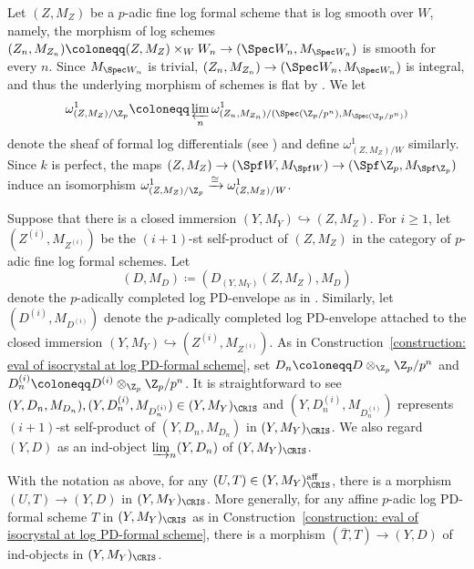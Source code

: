 Let $(Z,M_Z)$ be a $p$-adic fine log formal scheme that is log smooth over $W$, namely, the morphism of log schemes $(Z_n,M_{Z_n})\coloneqq (Z,M_Z)\times_WW_n\rightarrow (\Spec W_n,M_{\Spec W_n})$ is smooth for every $n$. 
Since $M_{\Spec W_n}$ is trivial, $(Z_n,M_{Z_n})\rightarrow (\Spec W_n,M_{\Spec W_n})$ is integral, and thus the underlying morphism of schemes is flat by \cite[Cor.~4.5]{Kato-log}.
We let 
\[
\omega^1_{(Z,M_Z)/\Z_p}\coloneqq \varprojlim_n \omega_{(Z_n,M_{Z_n})/(\Spec (\Z_p/p^n),M_{\Spec(\Z_p/p^n)})}^1
\]
denote the sheaf of formal log differentials (see \cite[Def.~2.1.14(2)]{Shiho-I}) and define $\omega^1_{(Z,M_Z)/W}$ similarly. Since $k$ is perfect, the maps $(Z,M_Z)\rightarrow (\Spf W,M_{\Spf W})\rightarrow (\Spf \Z_p, M_{\Spf \Z_p})$ induce an isomorphism $\omega_{(Z,M_Z)/\Z_p}^1\xrightarrow{\cong}\omega_{(Z,M_Z)/W}^1$.

Suppose that there is a closed immersion $(Y,M_Y)\hookrightarrow (Z,M_Z)$. 
For $i\geq 1$, let $(Z^{(i)},M_{Z^{(i)}})$ be the $(i+1)$-st self-product of $(Z,M_Z)$ in the category of $p$-adic fine log formal schemes. 
Let 
\[
(D,M_D)\coloneqq (D_{(Y,M_Y)}(Z,M_Z), M_D) 
\]
denote the $p$-adically completed log PD-envelope as in \cite[Def.~5.4]{Kato-log}. Similarly, let $(D^{(i)},M_{D^{(i)}})$ denote the $p$-adically completed log PD-envelope attached to the closed immersion $(Y,M_Y)\hookrightarrow (Z^{(i)},M_{Z^{(i)}})$. As in Construction~\ref{construction: eval of isocrystal at log PD-formal scheme}, set $D_n\coloneqq D\otimes_{\Z_p}\Z_p/p^n$ and $D_n^{(i)}\coloneqq D^{(i)}\otimes_{\Z_p}\Z_p/p^n$. It is straightforward to see $(Y,D_n,M_{D_n}), (Y,D_n^{(i)},M_{D_n^{(i)}})\in (Y,M_Y)_\CRIS$ and $(Y,D_n^{(i)},M_{D_n^{(i)}})$ represents $(i+1)$-st self-product of $(Y,D_n,M_{D_n})$ in $(Y,M_Y)_\CRIS$. We also regard $(Y,D)$ as an ind-object $\varinjlim_n (Y,D_n)$ of $(Y,M_Y)_{\CRIS}$.

\begin{lem}\label{lem:weakly-final}
With the notation as above, for any $(U,T) \in (Y,M_Y)_{\CRIS}^{\mathrm{aff}}$, there is a morphism $(U, T)\rightarrow (Y,D)$ in $(Y,M_Y)_{\CRIS}$. More generally, for any affine $p$-adic log PD-formal scheme $T$ in $(Y,M_Y)_\CRIS$ as in Construction~\ref{construction: eval of isocrystal at log PD-formal scheme}, there is a morphism $(\overline{T},T)\rightarrow (Y,D)$ of ind-objects in $(Y,M_Y)_\CRIS$.
\end{lem}

